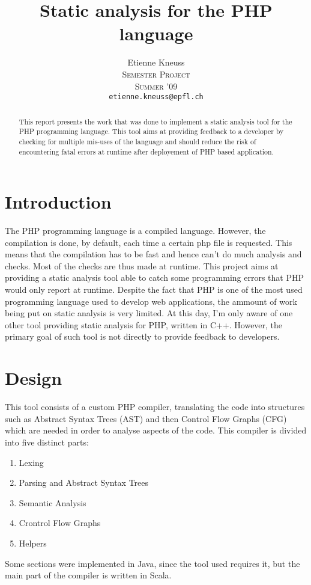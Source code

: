 \documentclass[a4paper]{article}
\author{Etienne Kneuss\\
\textsc{\small{Semester Project}}\\
\textsc{\small{Summer '09}}\\
\texttt{etienne.kneuss@epfl.ch}
}
\title{Static analysis for the PHP language}
\begin{document}
\maketitle
\begin{abstract}
  This report presents the work that was done to implement a static analysis
  tool for the PHP programming language. This tool aims at providing feedback
  to a developer by checking for multiple mis-uses of the language and should
  reduce the risk of encountering fatal errors at runtime after deployement of
  PHP based application.
\end{abstract}
\section{Introduction}
The PHP programming language is a compiled language. However, the compilation is
done, by default, each time a certain php file is requested. This means that the
compilation has to be fast and hence can't do much analysis and checks. Most of
the checks are thus made at runtime. This project aims at providing a static
analysis tool able to catch some programming errors that PHP would only report
at runtime. Despite the fact that PHP is one of the most used programming language
used to develop web applications, the ammount of work being put on static analysis
is very limited. At this day, I'm only aware of one other tool providing static
analysis for PHP, written in C++. However, the primary goal of such tool is
not directly to provide feedback to developers.

\section{Design}
This tool consists of a custom PHP compiler, translating the code
into structures such as Abstract Syntax Trees (AST) and then Control Flow Graphs
(CFG) which are needed in order to analyse aspects of the code. This compiler is
divided into five distinct parts:
\begin{enumerate}
  \item Lexing
  \item Parsing and Abstract Syntax Trees
  \item Semantic Analysis
  \item Crontrol Flow Graphs
  \item Helpers
\end{enumerate}

Some sections were implemented in Java, since the tool used requires it, but the
main part of the compiler is written in Scala.
\end{document}
